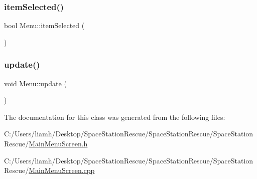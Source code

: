 \mbox{\label{class_menu_ac5eeddcd824866f1fd4b3ed6e8146724}} 
\subsubsection{\texorpdfstring{itemSelected()}{itemSelected()}}
{\footnotesize\ttfamily bool Menu\+::item\+Selected (\begin{DoxyParamCaption}{ }\end{DoxyParamCaption})}

\mbox{\label{class_menu_a8446e8a1e56e9cf1db93790067510a61}} 
\subsubsection{\texorpdfstring{update()}{update()}}
{\footnotesize\ttfamily void Menu\+::update (\begin{DoxyParamCaption}{ }\end{DoxyParamCaption})}



The documentation for this class was generated from the following files\+:\begin{DoxyCompactItemize}
\item 
C\+:/\+Users/liamh/\+Desktop/\+Space\+Station\+Rescue/\+Space\+Station\+Rescue/\+Space\+Station\+Rescue/\mbox{\hyperlink{_main_menu_screen_8h}{Main\+Menu\+Screen.\+h}}\item 
C\+:/\+Users/liamh/\+Desktop/\+Space\+Station\+Rescue/\+Space\+Station\+Rescue/\+Space\+Station\+Rescue/\mbox{\hyperlink{_main_menu_screen_8cpp}{Main\+Menu\+Screen.\+cpp}}\end{DoxyCompactItemize}
